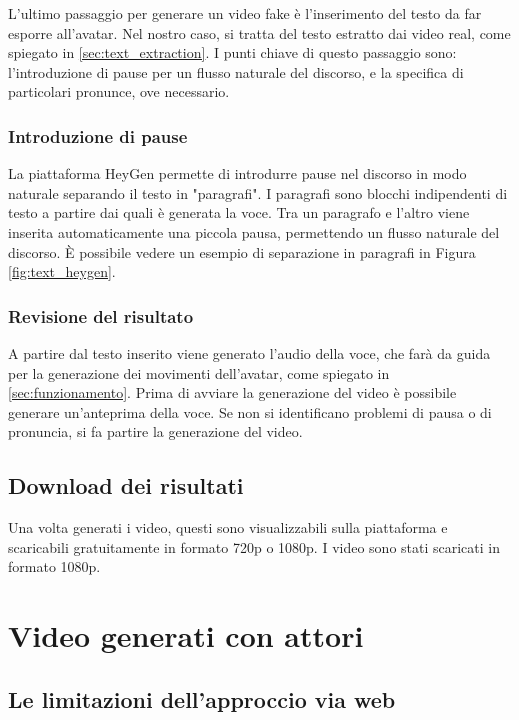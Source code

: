 L'ultimo passaggio per generare un video fake è l'inserimento del testo da far esporre all'avatar. Nel nostro caso, si tratta del testo estratto dai video real, come spiegato in \ref{sec:text_extraction}. 
I punti chiave di questo passaggio sono: l'introduzione di pause per un flusso naturale del discorso, e la specifica di particolari pronunce, ove necessario.

\subsubsection{Introduzione di pause}
    
La piattaforma HeyGen permette di introdurre pause nel discorso in modo naturale separando il testo in "paragrafi". I paragrafi sono blocchi indipendenti di testo a partire dai quali è generata la voce. Tra un paragrafo e l'altro viene inserita automaticamente una piccola pausa, permettendo un flusso naturale del discorso. È possibile vedere un esempio di separazione in paragrafi in Figura \ref{fig:text_heygen}.

\subsubsection{Revisione del risultato}

A partire dal testo inserito viene generato l'audio della voce, che farà da guida per la generazione dei movimenti dell'avatar, come spiegato in \ref{sec:funzionamento}. Prima di avviare la generazione del video è possibile generare un'anteprima della voce. Se non si identificano problemi di pausa o di pronuncia, si fa partire la generazione del video.

\subsection{Download dei risultati}

Una volta generati i video, questi sono visualizzabili sulla piattaforma e scaricabili gratuitamente in formato 720p o 1080p. I video sono stati scaricati in formato 1080p.

\section{Video generati con attori}

\subsection{Le limitazioni dell'approccio via web}

